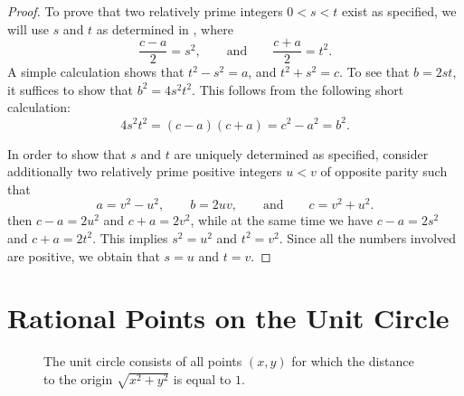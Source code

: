 \begin{proof}
  To prove that two relatively prime integers $0<s<t$ exist as specified, we will use $s$ and $t$ as determined in , where
  \begin{equation*}
    \frac{c-a}{2}=s^2,\qquad\text{and}\qquad\frac{c+a}{2}=t^2.
  \end{equation*}
  A simple calculation shows that $t^2-s^2=a$, and $t^2+s^2=c$. To see that $b=2st$, it suffices to show that $b^2=4s^2t^2$. This follows from the following short calculation:
  \begin{equation*}
    4s^2t^2=(c-a)(c+a)=c^2-a^2=b^2.
  \end{equation*}

  In order to show that $s$ and $t$ are uniquely determined as specified, consider additionally two relatively prime positive integers $u<v$ of opposite parity such that
    \begin{equation*}
    a=v^2-u^2,\qquad b=2uv,\qquad\text{and}\qquad c=v^2+u^2.
  \end{equation*}
  then $c-a=2u^2$ and $c+a=2v^2$, while at the same time we have $c-a=2s^2$ and $c+a=2t^2$. This implies $s^2=u^2$ and $t^2=v^2$. Since all the numbers involved are positive, we obtain that $s=u$ and $t=v$.
\end{proof}

\section{Rational Points on the Unit Circle}

\begin{figure}[t]
  \begin{center}
  \end{center}
  \caption[The unit circle]{The unit circle consists of all points $(x,y)$ for which the distance to the origin $\sqrt{x^2+y^2}$ is equal to $1$.}
  \label{figure:rational-points-unit-circle}
\end{figure}

